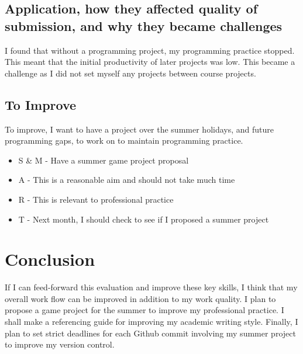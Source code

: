 \documentclass{scrartcl}
\begin{document}
\subsection*{Application, how they affected quality of submission, and why they became challenges}
I found that without a programming project, my programming practice stopped. This meant that the initial productivity of later projects was low. This became a challenge as I did not set myself any projects between course projects.

\subsection*{To Improve}
To improve, I want to have a project over the summer holidays, and future programming gaps, to work on to maintain programming practice.

 \begin{itemize}
   \item  S \& M - Have a summer game project proposal
	\item A - This is a reasonable aim and should not take much time
	\item R - This is relevant to professional practice
	\item T - Next month, I should check to see if I proposed a summer project
 \end{itemize}
 
 \section*{Conclusion}
 If I can feed-forward this evaluation and improve these key skills, I think that my overall work flow can be improved in addition to my work quality. I plan to propose a game project for the summer to improve my professional practice. I shall make a referencing guide for improving my academic writing style. Finally, I plan to set strict deadlines for each Github commit involving my summer project to improve my version control.
\end{document}
